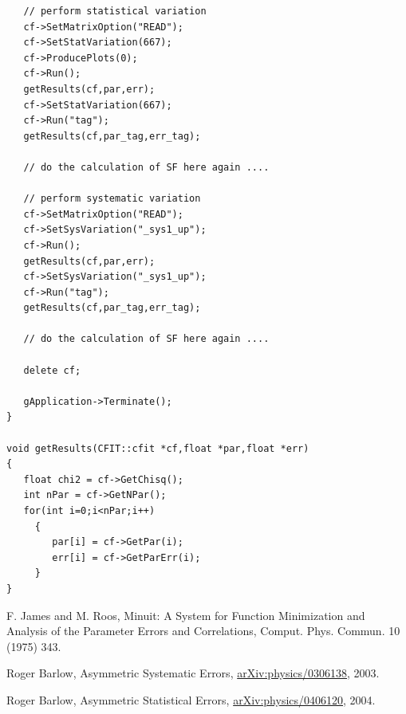 \documentclass[12pt]{article}
\begin{document}
\begin{verbatim}
   // perform statistical variation
   cf->SetMatrixOption("READ");
   cf->SetStatVariation(667);
   cf->ProducePlots(0);   
   cf->Run();
   getResults(cf,par,err);
   cf->SetStatVariation(667);
   cf->Run("tag");
   getResults(cf,par_tag,err_tag);
   
   // do the calculation of SF here again ....
   
   // perform systematic variation
   cf->SetMatrixOption("READ");
   cf->SetSysVariation("_sys1_up");
   cf->Run();
   getResults(cf,par,err);
   cf->SetSysVariation("_sys1_up");
   cf->Run("tag");
   getResults(cf,par_tag,err_tag);
   
   // do the calculation of SF here again ....
   
   delete cf;
   
   gApplication->Terminate();
}

void getResults(CFIT::cfit *cf,float *par,float *err)
{   
   float chi2 = cf->GetChisq();
   int nPar = cf->GetNPar();
   for(int i=0;i<nPar;i++)
     {
        par[i] = cf->GetPar(i);
        err[i] = cf->GetParErr(i);	
     }
}
\end{verbatim}

\begin{thebibliography}{9}

F. James and M. Roos,
Minuit: A System for Function Minimization and Analysis of the
Parameter Errors and Correlations,
Comput. Phys. Commun. 10 (1975) 343.

Roger Barlow, 
Asymmetric Systematic Errors,
\url{arXiv:physics/0306138},
2003.

Roger Barlow,
Asymmetric Statistical Errors,
\url{arXiv:physics/0406120},
2004.

\end{thebibliography}
\end{document}
